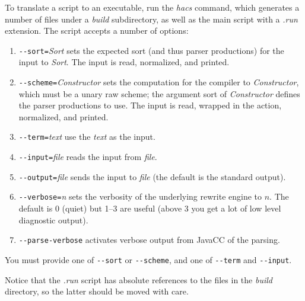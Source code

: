 \documentclass[11pt]{article} %
\begin{document}
\begin{manual}\label{man:run}\leavevmode
  To translate a \HAX script to an executable, run the \emph{hacs} command, which generates a number
  of files under a \emph{build} subdirectory, as well as the main script with a \emph{.run}
  extension.  The script accepts a number of options:
  \begin{enumerate}

  \item \verb"--sort="\emph{Sort} sets the expected sort (and thus parser productions) for the input to
    \emph{Sort}. The input is read, normalized, and printed.

  \item \verb"--scheme="\emph{Constructor} sets the computation for the compiler to \emph{Constructor},
    which must be a unary raw scheme; the argument sort of \emph{Constructor} defines the parser
    productions to use.  The input is read, wrapped in the action, normalized, and printed.

  \item \verb"--term="\emph{text} use the \emph{text} as the input.

  \item \verb"--input="\emph{file} reads the input from \emph{file}.

  \item \verb"--output="\emph{file} sends the input to \emph{file} (the default is the standard output).

  \item \verb"--verbose="\emph{n} sets the verbosity of the underlying \CRSX rewrite engine to $n$. The
    default is 0 (quiet) but 1--3 are useful (above 3 you get a lot of low level diagnostic output).

  \item \verb"--parse-verbose" activates verbose output from JavaCC of the parsing.

  \end{enumerate}
  You must provide one of \verb"--sort" or \verb"--scheme", and one of \verb"--term" and \verb"--input".

  Notice that the \emph{.run} script has absolute references to the files in the \emph{build}
  directory, so the latter should be moved with care.
\end{manual}


\end{document}
